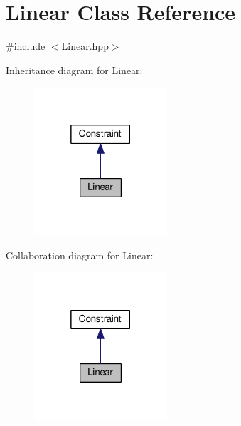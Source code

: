 \hypertarget{class_linear}{\section{Linear Class Reference}
\label{class_linear}
}


{\ttfamily \#include $<$Linear.\-hpp$>$}



Inheritance diagram for Linear\-:\nopagebreak
\begin{figure}[H]
\begin{center}
\leavevmode
\includegraphics[width=140pt]{class_linear__inherit__graph}
\end{center}
\end{figure}


Collaboration diagram for Linear\-:\nopagebreak
\begin{figure}[H]
\begin{center}
\leavevmode
\includegraphics[width=140pt]{class_linear__coll__graph}
\end{center}
\end{figure}

